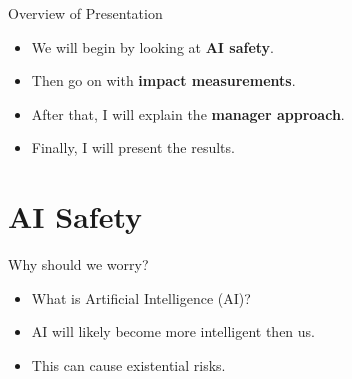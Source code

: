 \documentclass[10pt]{beamer}
\begin{document}
\begin{frame}{Overview of Presentation}
  \begin{itemize}[<+- | alert@+>]
    \item We will begin by looking at \textbf{AI safety}.
    \item Then go on with \textbf{impact measurements}.
    \item After that, I will explain the \textbf{manager approach}.
    \item Finally, I will present the results.
  \end{itemize}
\end{frame}


\section{AI Safety}

\begin{frame}{Why should we worry?}
  \begin{itemize}[<+- | alert@+>]
    \item What is Artificial Intelligence (AI)?
    \item AI will likely become more intelligent then us. 
    \item This can cause existential risks.
  \end{itemize}
   
\end{frame}
\end{document}
